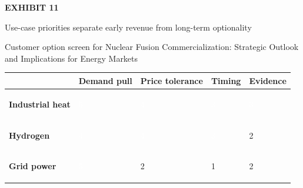 \documentclass[10pt,a4paper]{article}
\begin{document}
\clearpage
{\textcolor{BOGreen}{\scriptsize\bfseries EXHIBIT 11}}\par\vspace{4pt}
{\sffamily\fontsize{17}{21}\selectfont\color{BONavy} Use-case priorities separate early revenue from long-term optionality}\par
{\small\color{BOText} Customer option screen for Nuclear Fusion Commercialization: Strategic Outlook and Implications for Energy Markets}\par\vspace{6pt}
{\scriptsize\begin{tabular}{p{38mm}>{\centering\arraybackslash}p{21mm}>{\centering\arraybackslash}p{21mm}>{\centering\arraybackslash}p{21mm}>{\centering\arraybackslash}p{21mm}}
 & {\bfseries Demand pull} & {\bfseries Price tolerance} & {\bfseries Timing} & {\bfseries Evidence} \\
\hline
{\bfseries Industrial heat} & \colorbox{BOGreen}{\textcolor{white}{\strut\hspace{5pt}5\hspace{5pt}}} & \colorbox{BOGreen}{\textcolor{white}{\strut\hspace{5pt}4\hspace{5pt}}} & \colorbox{BOBlue}{\textcolor{white}{\strut\hspace{5pt}3\hspace{5pt}}} & \colorbox{BOBlue}{\textcolor{white}{\strut\hspace{5pt}3\hspace{5pt}}} \\
{\bfseries Hydrogen} & \colorbox{BOGreen}{\textcolor{white}{\strut\hspace{5pt}4\hspace{5pt}}} & \colorbox{BOGreen}{\textcolor{white}{\strut\hspace{5pt}4\hspace{5pt}}} & \colorbox{BOBlue}{\textcolor{white}{\strut\hspace{5pt}3\hspace{5pt}}} & \colorbox{BOLight}{\textcolor{BOText}{\strut\hspace{5pt}2\hspace{5pt}}} \\
{\bfseries Grid power} & \colorbox{BOGreen}{\textcolor{white}{\strut\hspace{5pt}5\hspace{5pt}}} & \colorbox{BOLight}{\textcolor{BOText}{\strut\hspace{5pt}2\hspace{5pt}}} & \colorbox{BOLight}{\textcolor{BOText}{\strut\hspace{5pt}1\hspace{5pt}}} & \colorbox{BOLight}{\textcolor{BOText}{\strut\hspace{5pt}2\hspace{5pt}}} \\

\end{tabular}}
\end{document}
